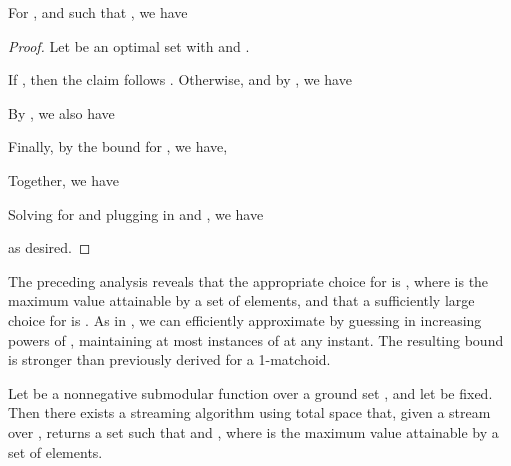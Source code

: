 \documentclass[oneside,letterpaper]{scrartcl} \usepackage{macros}
\begin{document}
\begin{lemma}
  For , and  such that , we have
  
\end{lemma}
\begin{proof}
  Let  be an optimal set with 
  and .

  If , then the claim follows
  .  Otherwise,  and by , we have
  
  By , we also have
  
  Finally, by the bound for , we have,
  
  Together, we have
  
  Solving for  and plugging in  and
  , we have
  
  as desired.
\end{proof}

The preceding analysis reveals that the appropriate choice for
 is , where  is the maximum value attainable by a set of 
elements, and that a sufficiently large choice for  is
. As in , we can
efficiently approximate  by guessing  in increasing
powers of , maintaining at most  instances of
at any instant. The resulting bound is stronger than previously
derived for a 1-matchoid.

\begin{theorem}
  Let  be a nonnegative submodular
  function over a ground set , and let  be
  fixed. Then there exists a streaming algorithm using total space
   that, given a stream over , returns a set 
  such that  and
  , where  is the maximum value attainable by a set of  elements.
\end{theorem}





\FloatBarrier
\end{document}
